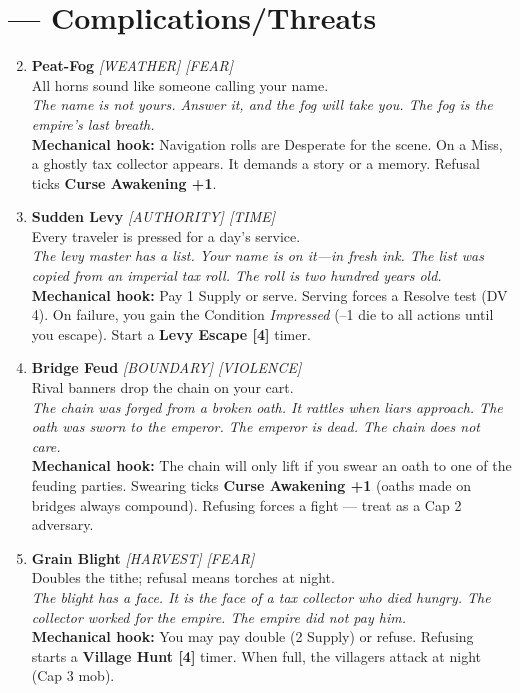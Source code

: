 \section*{ --- Complications/Threats}
\label{sec:acasia-complications}
\begin{enumerate}
\setcounter{enumi}{1}
\item \textbf{Peat-Fog} \hfill {} \textit{[WEATHER] [FEAR]} \\
  All horns sound like someone calling your name. \\
  \textit{The name is not yours. Answer it, and the fog will take you. The fog is the empire's last breath.} \\
  \textbf{Mechanical hook:} Navigation rolls are Desperate for the scene. On a Miss, a ghostly tax collector appears. It demands a story or a memory. Refusal ticks \textbf{Curse Awakening +1}.

\item \textbf{Sudden Levy} \hfill {} \textit{[AUTHORITY] [TIME]} \\
  Every traveler is pressed for a day's service. \\
  \textit{The levy master has a list. Your name is on it---in fresh ink. The list was copied from an imperial tax roll. The roll is two hundred years old.} \\
  \textbf{Mechanical hook:} Pay 1 Supply or serve. Serving forces a Resolve test (DV 4). On failure, you gain the Condition \textit{Impressed} (--1 die to all actions until you escape). Start a \textbf{Levy Escape [4]} timer.

\item \textbf{Bridge Feud} \hfill {} \textit{[BOUNDARY] [VIOLENCE]} \\
  Rival banners drop the chain on your cart. \\
  \textit{The chain was forged from a broken oath. It rattles when liars approach. The oath was sworn to the emperor. The emperor is dead. The chain does not care.} \\
  \textbf{Mechanical hook:} The chain will only lift if you swear an oath to one of the feuding parties. Swearing ticks \textbf{Curse Awakening +1} (oaths made on bridges always compound). Refusing forces a fight --- treat as a Cap 2 adversary.

\item \textbf{Grain Blight} \hfill {} \textit{[HARVEST] [FEAR]} \\
  Doubles the tithe; refusal means torches at night. \\
  \textit{The blight has a face. It is the face of a tax collector who died hungry. The collector worked for the empire. The empire did not pay him.} \\
  \textbf{Mechanical hook:} You may pay double (2 Supply) or refuse. Refusing starts a \textbf{Village Hunt [4]} timer. When full, the villagers attack at night (Cap 3 mob).


\end{enumerate}
